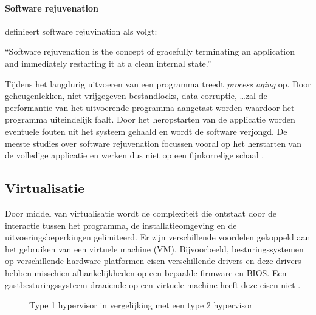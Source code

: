 \paragraph{Software rejuvenation}
\citet{huang1995software} definieert software rejuvination als volgt:
\begin{displayquote}
``Software rejuvenation is the concept of gracefully terminating an application and immediately restarting it at a clean internal state.''
\end{displayquote}
Tijdens het langdurig uitvoeren van een programma treedt \emph{process aging} op.
Door geheugenlekken, niet vrijgegeven bestandlocks, data corruptie, \ldots zal de performantie van het uitvoerende programma aangetast worden waardoor het programma uiteindelijk faalt.
Door het heropstarten van de applicatie worden eventuele fouten uit het systeem gehaald en wordt de software verjongd.
De meeste studies over software rejuvenation focussen vooral op het herstarten van de volledige applicatie en werken dus niet op een fijnkorrelige schaal \citep{srinivasan2004flashback}.

\subsection{Virtualisatie}\label{sec:virtualisatie}
Door middel van virtualisatie wordt de complexiteit die ontstaat door de interactie tussen het programma, de installatieomgeving en de uitvoeringsbeperkingen gelimiteerd.
Er zijn verschillende voordelen gekoppeld aan het gebruiken van een virtuele machine (VM).
Bijvoorbeeld, besturingssystemen op verschillende hardware platformen eisen verschillende drivers en deze drivers hebben misschien afhankelijkheden op een bepaalde firmware en BIOS.
Een gastbesturingssysteem draaiende op een virtuele machine heeft deze eisen niet \citep{shumate2004implications}.

\begin{figure}[!ht]
\centering
{}
\caption{Type 1 hypervisor in vergelijking met een type 2 hypervisor \citep{hypervisors}}
\label{fig:hypervisors}
\end{figure}

